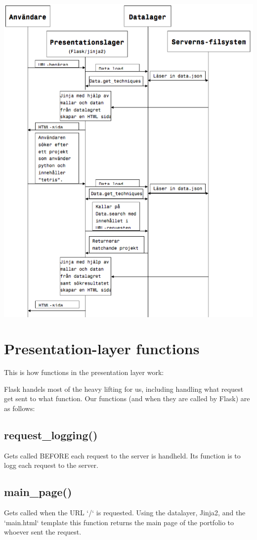 \documentclass{TDP003mall}
\begin{document}
\centerline{\includegraphics[scale=0.8]{graph_2}}

\section{Presentation-layer functions}\label{presentation-functions}

This is how functions in the presentation layer work:

Flask handels most of the heavy lifting for us, including handling what request get sent to what function. Our functions (and when they are called by Flask) are as follows:

\subsection{request\_logging()} 
Gets called BEFORE each request to the server is handheld. Its function is to logg each request to the server.

\subsection{main\_page()} 
Gets called when the URL `/` is requested. Using the datalayer, Jinja2, and the `main.html` template this function returns the main page of the portfolio to whoever sent the request.
\end{document}
